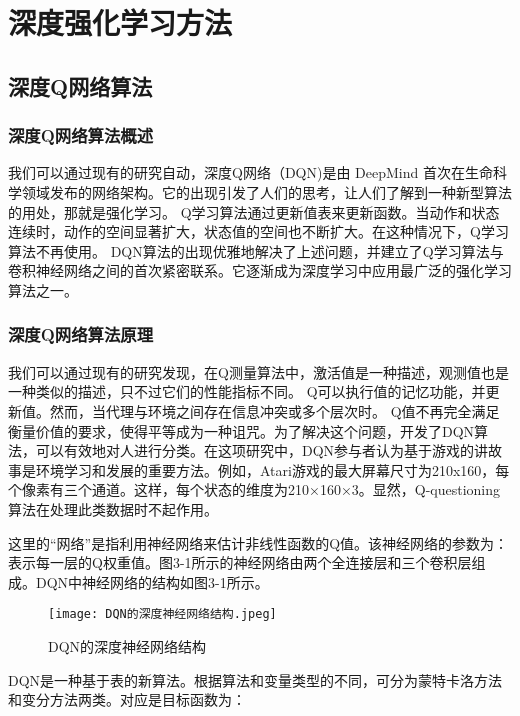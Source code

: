 \chapter{深度强化学习方法}

\section{深度Q网络算法 }

\subsection{深度Q网络算法概述 }

我们可以通过现有的研究自动，深度Q网络（DQN)\cite{mnih2015human}是由 DeepMind 首次在生命科学领域发布的网络架构。它的出现引发了人们的思考，让人们了解到一种新型算法的用处，那就是强化学习。 Q学习算法通过更新值表来更新函数。当动作和状态连续时，动作的空间显著扩大，状态值的空间也不断扩大。在这种情况下，Q学习算法不再使用。 DQN算法的出现优雅地解决了上述问题，并建立了Q学习算法与卷积神经网络之间的首次紧密联系。它逐渐成为深度学习中应用最广泛的强化学习算法之一。

\subsection{深度Q网络算法原理 }

我们可以通过现有的研究发现，在Q测量算法中，激活值是一种描述，观测值也是一种类似的描述，只不过它们的性能指标不同。 Q可以执行值的记忆功能，并更新值。然而，当代理与环境之间存在信息冲突或多个层次时。 Q值不再完全满足衡量价值的要求，使得平等成为一种诅咒。为了解决这个问题，开发了DQN算法，可以有效地对人进行分类。在这项研究中，DQN参与者认为基于游戏的讲故事是环境学习和发展的重要方法。例如，Atari游戏的最大屏幕尺寸为210x160，每个像素有三个通道。这样，每个状态的维度为210×160×3。显然，Q-questioning算法在处理此类数据时不起作用。

这里的“网络”是指利用神经网络来估计非线性函数的Q值。该神经网络的参数为： 表示每一层的Q权重值。图3-1所示的神经网络由两个全连接层和三个卷积层组成。DQN中神经网络的结构如图3-1所示。

\begin{figure}[hbt]
	\centering
	\texttt{[image: DQN的深度神经网络结构.jpeg]}
	\caption{DQN的深度神经网络结构}
	\label{f.example}
\end{figure}

DQN是一种基于表的新算法。根据算法和变量类型的不同，可分为蒙特卡洛方法和变分方法两类。对应是目标函数为：

